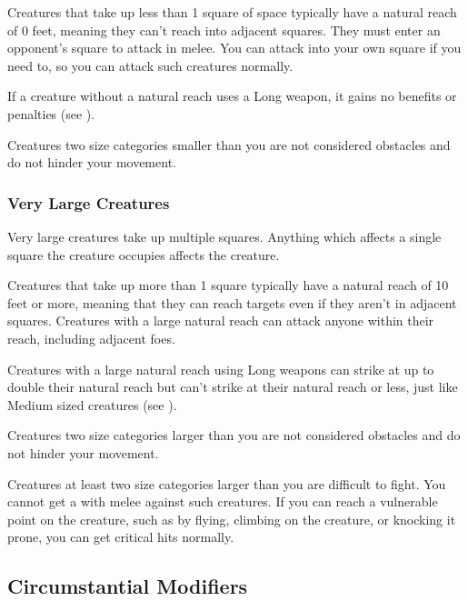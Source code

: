              Creatures that take up less than 1 square of space typically have a natural reach of 0 feet, meaning they can't reach into adjacent squares. They must enter an opponent's square to attack in melee. You can attack into your own square if you need to, so you can attack such creatures normally.

            If a creature without a natural reach uses a Long weapon, it gains no benefits or penalties (see ).

             Creatures two size categories smaller than you are not considered obstacles and do not hinder your movement.

        \subsubsection{Very Large Creatures}\label{Very Large Creatures}
             Very large creatures take up multiple squares. Anything which affects a single square the creature occupies affects the creature.

             Creatures that take up more than 1 square typically have a natural reach of 10 feet or more, meaning that they can reach targets even if they aren't in adjacent squares. Creatures with a large natural reach can attack anyone within their reach, including adjacent foes.

            Creatures with a large natural reach using Long weapons can strike at up to double their natural reach but can't strike at their natural reach or less, just like Medium sized creatures (see ).

             Creatures two size categories larger than you are not considered obstacles and do not hinder your movement.

             Creatures at least two size categories larger than you are difficult to fight.
            You cannot get a  with melee  against such creatures.
            If you can reach a vulnerable point on the creature, such as by flying, climbing on the creature, or knocking it prone, you can get critical hits normally.

    \subsection{Circumstantial Modifiers}


